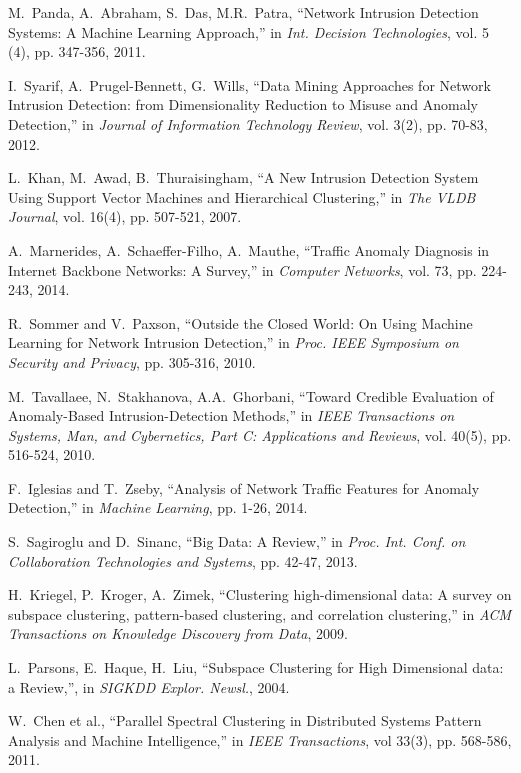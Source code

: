 \documentclass[10pt, conference, letterpaper]{IEEEtran}
\begin{document}
\begin{thebibliography}{99}
M.~Panda, A.~Abraham, S.~Das, M.R.~Patra, ``Network Intrusion Detection Systems: A Machine Learning Approach,'' in \emph{Int. Decision Technologies}, vol. 5 (4), pp. 347-356, 2011.

I.~Syarif, A.~Prugel-Bennett, G.~Wills, ``Data Mining Approaches for Network Intrusion Detection: from Dimensionality Reduction to Misuse and Anomaly Detection,'' in \emph{Journal of Information Technology Review}, vol. 3(2), pp. 70-83, 2012.

L.~Khan, M.~Awad, B.~Thuraisingham, ``A New Intrusion Detection System Using Support Vector Machines and Hierarchical Clustering,'' in \emph{The VLDB Journal}, vol. 16(4), pp. 507-521, 2007.

A.~Marnerides, A.~Schaeffer-Filho, A.~Mauthe, ``Traffic Anomaly Diagnosis in Internet Backbone Networks: A Survey,'' in \emph{Computer Networks}, vol. 73, pp. 224-243, 2014.

R.~Sommer and V.~Paxson, ``Outside the Closed World: On Using Machine Learning for Network Intrusion Detection,'' in \emph{Proc. IEEE Symposium on Security and Privacy}, pp. 305-316, 2010.

M.~Tavallaee, N.~Stakhanova, A.A.~Ghorbani, ``Toward Credible Evaluation of Anomaly-Based Intrusion-Detection Methods,'' in \emph{IEEE Transactions on Systems, Man, and Cybernetics, Part C: Applications and Reviews}, vol. 40(5), pp. 516-524, 2010.

F.~Iglesias and T.~Zseby, ``Analysis of Network Traffic Features for Anomaly Detection,'' in \emph{Machine Learning}, pp. 1-26, 2014.

S.~Sagiroglu and D.~Sinanc, ``Big Data: A Review,'' in \emph{Proc. Int. Conf. on Collaboration Technologies and Systems}, pp. 42-47, 2013.

H.~Kriegel, P.~Kroger, A.~Zimek, ``Clustering high-dimensional data: A survey on subspace clustering, pattern-based clustering, and correlation clustering,'' in \emph{ACM Transactions on Knowledge Discovery from Data}, 2009.

L.~Parsons, E.~Haque, H.~Liu, ``Subspace Clustering for High Dimensional data: a Review,'', in \emph{SIGKDD Explor. Newsl.}, 2004.

W.~Chen et al., ``Parallel Spectral Clustering in Distributed Systems Pattern Analysis and Machine Intelligence,'' in \emph{IEEE Transactions}, vol 33(3), pp. 568-586, 2011.


\end{thebibliography}
\end{document}
